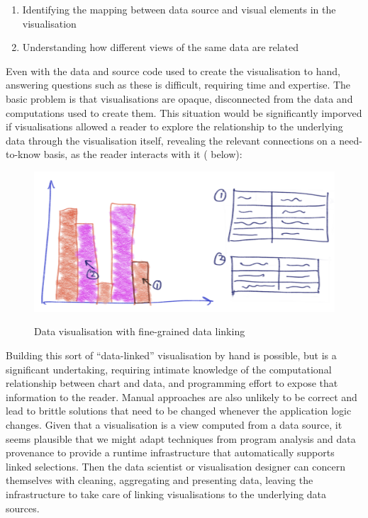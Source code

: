 \begin{enumerate}
  \item Identifying the mapping between data source and visual elements in the visualisation
  \item Understanding how different views of the same data are related
\end{enumerate}

\noindent Even with the data and source code used to create the visualisation to hand, answering questions such as these is difficult, requiring time and expertise. The basic problem is that visualisations are opaque, disconnected from the data and computations used to create them. This situation would be significantly imporved if visualisations allowed a reader to explore the relationship to the underlying data through the visualisation itself, revealing the relevant connections on a need-to-know basis, as the reader interacts with it ( below):

\begin{figure}[H]
   {\includegraphics[scale=0.07]{fig/example/data-linking.png}}
   \caption{Data visualisation with fine-grained data linking}
   \label{fig:introduction:data-linking}
\end{figure}

Building this sort of ``data-linked'' visualisation by hand is possible, but is a significant undertaking, requiring intimate knowledge of the computational relationship between chart and data, and programming effort to expose that information to the reader. Manual approaches are also unlikely to be correct and lead to brittle solutions that need to be changed whenever the application logic changes. Given that a visualisation is a view computed from a data source, it seems plausible that we might adapt techniques from program analysis and data provenance to provide a runtime infrastructure that automatically supports linked selections. Then the data scientist or visualisation designer can concern themselves with cleaning, aggregating and presenting data, leaving the infrastructure to take care of linking visualisations to the underlying data sources.

